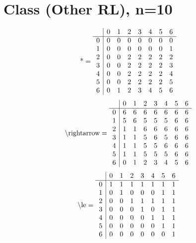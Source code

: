 \documentclass[11pt]{article}
\begin{document}
\section{Class (Other RL), n=10}
\[\text{*} = 
\begin{array}{r | r r r r r r r}
 & 0 & 1 & 2 & 3 & 4 & 5 & 6 \\ \hline
0 & 0 & 0 & 0 & 0 & 0 & 0 & 0 \\
1 & 0 & 0 & 0 & 0 & 0 & 0 & 1 \\
2 & 0 & 0 & 2 & 2 & 2 & 2 & 2 \\
3 & 0 & 0 & 2 & 2 & 2 & 2 & 3 \\
4 & 0 & 0 & 2 & 2 & 2 & 2 & 4 \\
5 & 0 & 0 & 2 & 2 & 2 & 2 & 5 \\
6 & 0 & 1 & 2 & 3 & 4 & 5 & 6 \\
\end{array}
\]
\[\text{\textbackslash rightarrow} = 
\begin{array}{r | r r r r r r r}
 & 0 & 1 & 2 & 3 & 4 & 5 & 6 \\ \hline
0 & 6 & 6 & 6 & 6 & 6 & 6 & 6 \\
1 & 5 & 6 & 5 & 5 & 5 & 6 & 6 \\
2 & 1 & 1 & 6 & 6 & 6 & 6 & 6 \\
3 & 1 & 1 & 5 & 6 & 5 & 6 & 6 \\
4 & 1 & 1 & 5 & 5 & 6 & 6 & 6 \\
5 & 1 & 1 & 5 & 5 & 5 & 6 & 6 \\
6 & 0 & 1 & 2 & 3 & 4 & 5 & 6 \\
\end{array}
\]
\[\text{\textbackslash le} = 
\begin{array}{r | r r r r r r r}
 & 0 & 1 & 2 & 3 & 4 & 5 & 6 \\ \hline
0 & 1 & 1 & 1 & 1 & 1 & 1 & 1 \\
1 & 0 & 1 & 0 & 0 & 0 & 1 & 1 \\
2 & 0 & 0 & 1 & 1 & 1 & 1 & 1 \\
3 & 0 & 0 & 0 & 1 & 0 & 1 & 1 \\
4 & 0 & 0 & 0 & 0 & 1 & 1 & 1 \\
5 & 0 & 0 & 0 & 0 & 0 & 1 & 1 \\
6 & 0 & 0 & 0 & 0 & 0 & 0 & 1 \\
\end{array}
\]
\end{document}
